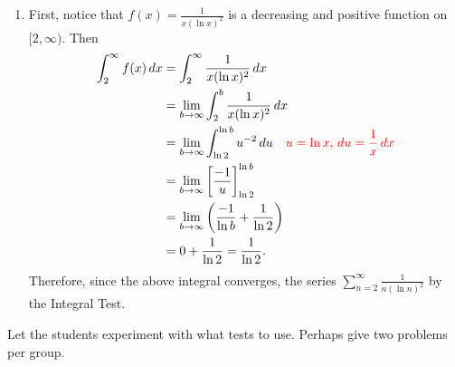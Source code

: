 \documentclass[noinstructornotes]{ximera}
\begin{document}
\begin{problem}
\begin{freeResponse}
\begin{enumerate}
		
	
		\item  {}
		
		First, notice that $f(x) = \frac{1}{x (\ln x)^2}$ is a decreasing and positive function on $[2,\infty)$.
		Then
			\begin{align*}
			\int_2^\infty f(x) \,d x 
			&= \int_2^\infty \frac{1}{x (\ln x)^2} \,d x  \\
			&= \lim_{b \to \infty} \int_2^b \frac{1}{x (\ln x)^2} \,d x  \\
			&= \lim_{b \to \infty} \int_{\ln 2}^{\ln b} u^{-2} \,d u  \quad  {\color{red} u = \ln x, \,du = \frac{1}{x} \,dx}  \\
			&= \lim_{b \to \infty} \bigg[ \frac{-1}{u} \bigg]_{\ln 2}^{\ln b}  \\
			&= \lim_{b \to \infty} \left( \frac{-1}{\ln b} + \frac{1}{\ln 2} \right)  \\
			&= 0 + \frac{1}{\ln 2} = \frac{1}{\ln 2}.
			\end{align*}
		Therefore, since the above integral converges, the series $\sum_{n=2}^\infty \frac{1}{n(\ln n)^2}$  by the Integral Test.
	
%
		
		\end{enumerate}
	\end{freeResponse}
	
\end{problem}

\begin{instructorNotes}
Let the students experiment with what tests to use.  
Perhaps give two problems per group.
\end{instructorNotes}
\end{document}
